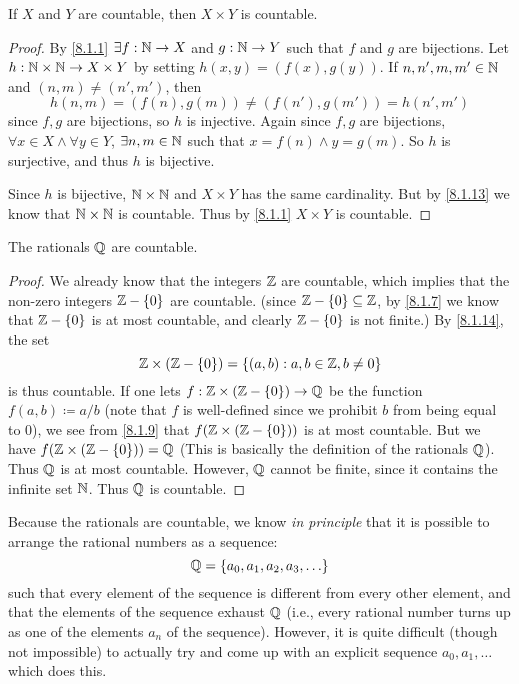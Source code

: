 \begin{cor}\label{8.1.14}
  If \(X\) and \(Y\) are countable, then \(X \times Y\) is countable.
\end{cor}

\begin{proof}
  By \cref{8.1.1} \(\exists f : \mathbb{N} \to X\) and \(g : \mathbb{N} \to Y\) such that \(f\) and \(g\) are bijections.
  Let \(h : \mathbb{N} \times \mathbb{N} \to X \times Y\) by setting \(h(x, y) = (f(x), g(y))\).
  If \(n, n', m, m' \in \mathbb{N}\) and \((n, m) \neq (n', m')\), then
  \[
    h(n, m) = (f(n), g(m)) \neq (f(n'), g(m')) = h(n', m')
  \]
  since \(f, g\) are bijections, so \(h\) is injective.
  Again since \(f, g\) are bijections, \(\forall x \in X \land \forall y \in Y\), \(\exists n, m \in \mathbb{N}\) such that \(x = f(n) \land y = g(m)\).
  So \(h\) is surjective, and thus \(h\) is bijective.

  Since \(h\) is bijective, \(\mathbb{N} \times \mathbb{N}\) and \(X \times Y\) has the same cardinality.
  But by \cref{8.1.13} we know that \(\mathbb{N} \times \mathbb{N}\) is countable.
  Thus by \cref{8.1.1} \(X \times Y\) is countable.
\end{proof}

\begin{cor}\label{8.1.15}
  The rationals \(\mathbb{Q}\) are countable.
\end{cor}

\begin{proof}
  We already know that the integers \(\mathbb{Z}\) are countable, which implies that the non-zero integers \(\mathbb{Z} - \left\lbrace0\right\rbrace\) are countable.
  (since \(\mathbb{Z} - \left\lbrace0\right\rbrace \subseteq \mathbb{Z}\), by \cref{8.1.7} we know that \(\mathbb{Z} - \left\lbrace0\right\rbrace\) is at most countable, and clearly \(\mathbb{Z} - \left\lbrace0\right\rbrace\) is not finite.)
  By \cref{8.1.14}, the set
  \[
    \mathbb{Z} \times (\mathbb{Z} - \left\lbrace0\right\rbrace) = \left\lbrace(a, b) : a, b \in \mathbb{Z}, b \neq 0\right\rbrace
  \]
  is thus countable.
  If one lets \(f : \mathbb{Z} \times (\mathbb{Z} - \left\lbrace0\right\rbrace) \to \mathbb{Q}\) be the function \(f(a, b) \coloneqq a / b\)
  (note that \(f\) is well-defined since we prohibit \(b\) from being equal to \(0\)), we see from \cref{8.1.9} that \(f(\mathbb{Z} \times (\mathbb{Z} - \left\lbrace0\right\rbrace))\) is at most countable.
  But we have \(f(\mathbb{Z} \times (\mathbb{Z} - \left\lbrace0\right\rbrace)) = \mathbb{Q}\)
  (This is basically the definition of the rationals \(\mathbb{Q}\)).
  Thus \(\mathbb{Q}\) is at most countable.
  However, \(\mathbb{Q}\) cannot be finite, since it contains the infinite set \(\mathbb{N}\).
  Thus \(\mathbb{Q}\) is countable.
\end{proof}

\begin{rmk}\label{8.1.16}
  Because the rationals are countable, we know \emph{in principle} that it is possible to arrange the rational numbers as a sequence:
  \[
    \Q = \set{a_0, a_1, a_2, a_3, \dots}
  \]
  such that every element of the sequence is different from every other element, and that the elements of the sequence exhaust \(\mathbb{Q}\)
  (i.e., every rational number turns up as one of the elements \(a_n\) of the sequence).
  However, it is quite difficult (though not impossible) to actually try and come up with an explicit sequence \(a_0, a_1, \dots\) which does this.
\end{rmk}

